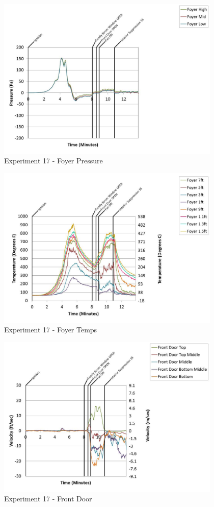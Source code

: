 \documentclass{article}
\begin{document}
\begin{appendices}
	\begin{figure}[h!]
		\centering
		\includegraphics[height=3.05in]{0_Images/Results_Charts/Exp_17_Charts/FoyerPressure.pdf}
		\caption{Experiment 17 - Foyer Pressure}
	\end{figure}
 
	\clearpage

	\begin{figure}[h!]
		\centering
		\includegraphics[height=3.05in]{0_Images/Results_Charts/Exp_17_Charts/FoyerTemps.pdf}
		\caption{Experiment 17 - Foyer Temps}
	\end{figure}
 

	\begin{figure}[h!]
		\centering
		\includegraphics[height=3.05in]{0_Images/Results_Charts/Exp_17_Charts/FrontDoor.pdf}
		\caption{Experiment 17 - Front Door}
	\end{figure}
 

\end{appendices}
\end{document}
